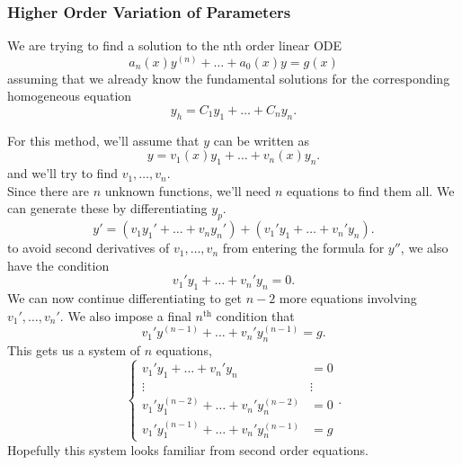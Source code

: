 \subsubsection{Higher Order Variation of Parameters}
\noindent
We are trying to find a solution to the nth order linear ODE
\begin{equation*}
	a_n(x)y^{(n)} + \ldots + a_0(x)y = g(x)
\end{equation*}
assuming that we already know the fundamental solutions for the corresponding homogeneous equation
\begin{equation*}
	y_h = C_1y_1 + \ldots + C_ny_n.
\end{equation*}

\noindent
For this method, we'll assume that $y$ can be written as
\begin{equation*}
	y = v_1(x)y_1 + \ldots + v_n(x)y_n.
\end{equation*}
and we'll try to find $v_1, \ldots, v_n$.\\

\noindent
Since there are $n$ unknown functions, we'll need $n$ equations to find them all.
We can generate these by differentiating $y_p$.
\begin{equation*}
	y' = \left(v_1y_1' + \ldots + v_ny_n'\right) + \left(v_1'y_1 + \ldots + v_n'y_n\right).
\end{equation*}
to avoid second derivatives of $v_1, \ldots, v_n$ from entering the formula for $y''$, we also have the condition
\begin{equation*}
	v_1'y_1 + \ldots +v_n'y_n = 0.
\end{equation*}
We can now continue differentiating to get $n-2$ more equations involving $v_1', \ldots, v_n'$.
We also impose a final $n^{\text{th}}$ condition that
\begin{equation*}
	v_1'y^{(n-1)} + \ldots + v_n'y_n^{(n-1)} = g.
\end{equation*}
This gets us a system of $n$ equations,
\begin{equation*}
	\begin{cases}
		v_1'y_1 + \ldots + v_n' y_n & = 0 \\
		\vdots & \vdots \\
		v_1'y_1^{(n-2)} + \ldots + v_n'y_n^{(n-2)} & = 0 \\
		v_1'y_1^{(n-1)} + \ldots + v_n'y_n^{(n-1)} & = g
	\end{cases} .
\end{equation*}
Hopefully this system looks familiar from second order equations.\\

